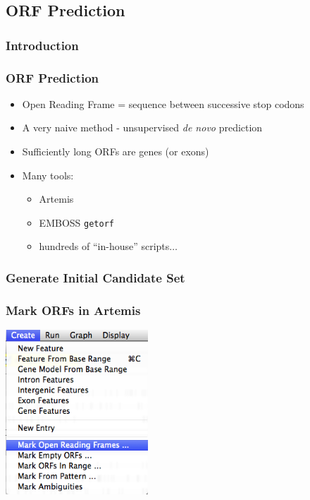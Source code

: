 %

\subsection{ORF Prediction}
\subsubsection{Introduction}
\begin{frame}
  \frametitle{ORF Prediction}
  \begin{itemize}
    \item Open Reading Frame = sequence between successive stop codons
    \item A very naive method - unsupervised \textit{de novo} prediction
    \item Sufficiently long ORFs are genes (or exons)
    \item Many tools:
    \begin{itemize}
      \item Artemis
      \item EMBOSS \texttt{getorf}
      \item hundreds of ``in-house'' scripts$\ldots$
    \end{itemize}
  \end{itemize}
\end{frame}

\subsubsection{Generate Initial Candidate Set}
\begin{frame}
  \frametitle{Mark ORFs in Artemis}    
  \begin{center}
    \includegraphics[width=0.4\textwidth]{images/artemis_orf0}     
  \end{center}
\end{frame}

